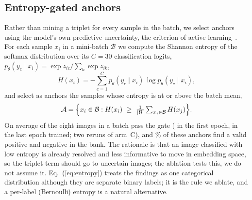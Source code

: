 \documentclass{article}
\begin{document}
\subsection{Entropy-gated anchors}
Rather than mining a triplet for every sample in the batch, we select anchors using the model's own predictive uncertainty, the criterion of active learning~\cite{settles2009active}. For each sample $x_i$ in a mini-batch $\mathcal{B}$ we compute the Shannon entropy of the softmax distribution over its $C=30$ classification logits, $p_\theta(y_c\mid x_i)=\exp z_{ic}/\sum_{k}\exp z_{ik}$,
\begin{equation}
H(x_i)=-\sum_{c=1}^{C}p_\theta(y_c\mid x_i)\,\log p_\theta(y_c\mid x_i),
\label{eq:entropy}
\end{equation}
and select as anchors the samples whose entropy is at or above the batch mean,
\begin{equation}
\mathcal{A}=\Bigl\{x_i\in\mathcal{B}:H(x_i)\ \ge\ \tfrac{1}{|\mathcal{B}|}\textstyle\sum_{x_j\in\mathcal{B}}H(x_j)\Bigr\}.
\label{eq:gate}
\end{equation}
On average \AblRerunAnchors{} of the eight images in a batch pass the gate (\AblRerunAnchorsFirst{} in the first epoch, \AblRerunAnchorsLast{} in the last epoch trained; two reruns of arm~C), and \AblRerunYield\% of these anchors find a valid positive and negative in the bank. The rationale is that an image classified with low entropy is already resolved and less informative to move in embedding space, so the triplet term should go to uncertain images; the ablation tests this, we do not assume it. Eq.~(\ref{eq:entropy}) treats the findings as one categorical distribution although they are separate binary labels; it is the rule we ablate, and a per-label (Bernoulli) entropy is a natural alternative.
\end{document}
